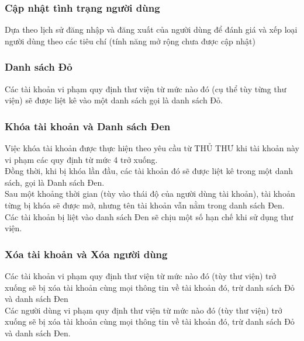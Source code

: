 \documentclass[12pt,a4paper]{report}
\begin{document}
            \subsubsection{Cập nhật tình trạng người dùng}
            Dựa theo lịch sử đăng nhập và đăng xuất của người dùng để đánh giá và xếp loại người dùng theo các tiêu chí (tính năng mở rộng chưa được cập nhật)\\ %

            \subsubsection{Danh sách Đỏ}
            Các tài khoản vi phạm quy định thư viện từ mức nào đó (cụ thể tùy từng thư viện) sẽ được liệt kê vào một danh sách gọi là danh sách Đỏ.\\

            \subsubsection{Khóa tài khoản và Danh sách Đen}
            Việc khóa tài khoản được thực hiện theo yêu cầu từ THỦ THƯ khi tài khoản này vi phạm các quy định từ mức 4 trở xuống.\\
            Đồng thời, khi bị khóa lần đầu, các tài khoản đó sẽ được liệt kê trong một danh sách, gọi là Danh sách Đen.\\
            Sau một khoảng thời gian (tùy vào thái độ của người dùng tài khoản), tài khoản từng bị khóa sẽ được mở, nhưng tên tài khoản vẫn nằm trong danh sách Đen.\\
            Các tài khoản bị liệt vào danh sách Đen sẽ chịu một số hạn chế khi sử dụng thư viện.\\

            \subsubsection{Xóa tài khoản và Xóa người dùng}
            Các tài khoản vi phạm quy định thư viện từ mức nào đó (tùy thư viện) trở xuống sẽ bị xóa tài khoản cùng mọi thông tin về tài khoản đó, trừ danh sách Đỏ và danh sách Đen\\
            Các người dùng vi phạm quy định thư viện từ mức nào đó (tùy thư viện) trở xuống sẽ bị xóa tài khoản cùng mọi thông tin về tài khoản đó, trừ danh sách Đỏ và danh sách Đen.\\
    \newpage
\end{document}
